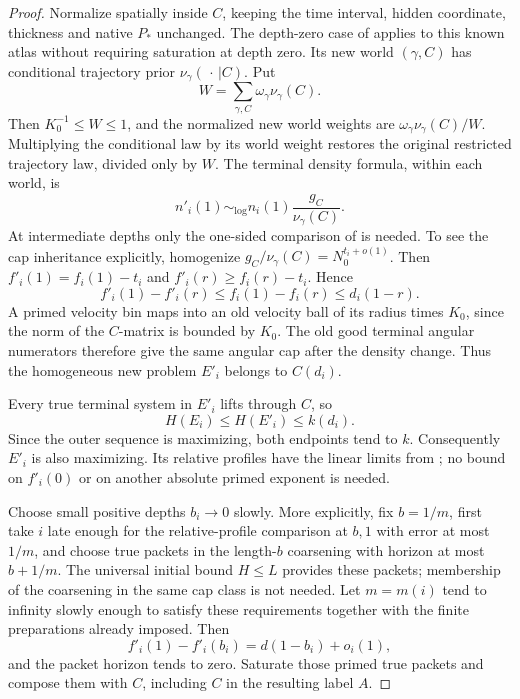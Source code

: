 \begin{proof}
Normalize spatially inside \(C\), keeping the time interval, hidden
coordinate, thickness and native \(P_*\) unchanged.
The depth-zero case of  applies to this known
atlas without requiring saturation at depth zero.  Its new world
\((\gamma,C)\) has conditional trajectory prior
\(\nu_\gamma(\,\cdot\,|C)\).  Put
\[
 W=\sum_{\gamma,C}\omega_\gamma\nu_\gamma(C).
\]
Then \(K_0^{-1}\le W\le1\), and the normalized new world weights are
\(\omega_\gamma\nu_\gamma(C)/W\).
Multiplying the conditional law by its world weight restores the
original restricted trajectory law, divided only by \(W\).
The terminal density formula, within each world, is
\begin{equation}
 \label{a08:primed-terminal}
 n'_i(1)\sim_{\log}
 n_i(1)\frac{g_C}{\nu_\gamma(C)}.
\end{equation}
At intermediate depths only the one-sided comparison of
 is needed.  To see the cap inheritance
explicitly, homogenize \(g_C/\nu_\gamma(C)=N_0^{t_i+o(1)}\).
Then \(f'_i(1)=f_i(1)-t_i\) and
\(f'_i(r)\ge f_i(r)-t_i\).  Hence
\[
 f'_i(1)-f'_i(r)\le f_i(1)-f_i(r)\le d_i(1-r).
\]
A primed velocity bin maps into an old velocity ball of its radius
times \(K_0\), since the norm of the \(C\)-matrix is bounded by
\(K_0\).  The old good terminal angular numerators therefore give
the same angular cap after the density change.  Thus the homogeneous
new problem \(E'_i\) belongs to \(C(d_i)\).

Every true terminal system in \(E'_i\) lifts through \(C\), so
\[
 H(E_i)\le H(E'_i)\le k(d_i).
\]
Since the outer sequence is maximizing, both endpoints tend to \(k\).
Consequently \(E'_i\) is also maximizing.  Its relative profiles have
the linear limits from ; no bound on
\(f'_i(0)\) or on another absolute primed exponent is needed.

Choose small positive depths \(b_i\to0\) slowly.  More explicitly, fix
\(b=1/m\), first take \(i\) late enough for the relative-profile
comparison at \(b,1\) with error at most \(1/m\), and choose true
packets in the length-\(b\) coarsening with horizon at most \(b+1/m\).
The universal initial bound \(H\le L\) provides these packets;
membership of the coarsening in the same cap class is not needed.
Let \(m=m(i)\) tend to infinity slowly enough to satisfy these
requirements together with the finite preparations already imposed.
Then
\begin{equation}
 \label{a08:primed-relative}
 f'_i(1)-f'_i(b_i)=d(1-b_i)+o_i(1),
\end{equation}
and the packet horizon tends to zero.  Saturate those primed true
packets and compose them with \(C\), including \(C\) in the resulting
label \(A\).


\end{proof}
